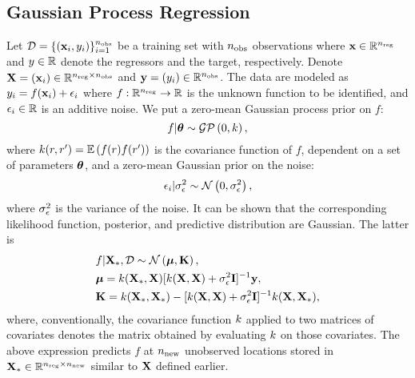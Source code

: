 \subsection{Gaussian Process Regression} 
Let $\mathcal{D} = \{ (\mathbf{x}_i, y_i) \}_{i = 1}^{n_\text{obs}}$ be a training set with ${n_\text{obs}}$ observations where $\mathbf{x} \in \mathbb{R}^{n_\text{reg}}$ and $y \in \mathbb{R}$ denote the regressors and the target, respectively. Denote $\mathbf{X} = (\mathbf{x}_i) \in \mathbb{R}^{{n_\text{reg}} \times {n_\text{obs}}}$ and $\mathbf{y} = (y_i) \in \mathbb{R}^{n_\text{obs}}$. The data are modeled as $y_i = f(\mathbf{x}_i) + \epsilon_i$ where $f: \mathbb{R}^{n_\text{reg}} \to \mathbb{R}$ is the unknown function to be identified, and $\epsilon_i \in \mathbb{R}$ is an additive noise. We put a zero-mean Gaussian process prior on $f$:
\[
  f | \vparam \sim \gaussianp{0}{\fCov},
\]
where $\fCov{\r, \r'} = \E{f(\r) f(\r')}$ is the covariance function of $f$, dependent on a set of parameters ${\boldsymbol\theta}$, and a zero-mean Gaussian prior on the noise:
\[
  \epsilon_i | \sigma^2_\epsilon \sim \mathcal{N}\left( 0, \sigma^2_\epsilon \right),
\]
where $\sigma^2_\epsilon$ is the variance of the noise. It can be shown \cite{rasmussen2006} that the corresponding likelihood function, posterior, and predictive distribution are Gaussian. The latter is
\begin{align*}
  & f | \m{X}_*, \data \sim \gaussian{\vMean}{\mCov}, \\
  & \vMean = \fCov{\m{X}_*, \m{X}} [ \fCov{\m{X}, \m{X}} + \sigma^2_\noise \mI ]^{-1} \v{y}, \\
  & \mCov = \fCov{\m{X}_*, \m{X}_*} - [ \fCov{\m{X}, \m{X}} + \sigma^2_\noise \mI ]^{-1} \fCov{\m{X}, \m{X}_*},
\end{align*}
where, conventionally, the covariance function $\fCov$ applied to two matrices of covariates denotes the matrix obtained by evaluating $\fCov$ on those covariates. The above expression predicts $f$ at ${n_\text{new}}$ unobserved locations stored in $\mathbf{X}_* \in \mathbb{R}^{{n_\text{reg}} \times {n_\text{new}}}$ similar to $\mathbf{X}$ defined earlier.
